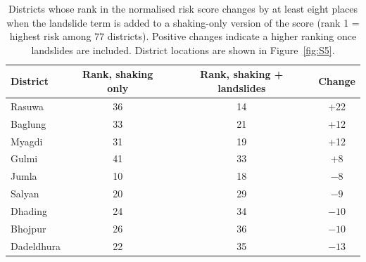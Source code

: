 \documentclass[preprint,12pt,authoryear]{elsarticle}
\begin{document}
\begin{table}[H]
    \centering
    \caption{Districts whose rank in the normalised risk score changes by at least eight places when the landslide term is added to a shaking-only version of the score (rank 1 = highest risk among 77 districts). Positive changes indicate a higher ranking once landslides are included. District locations are shown in Figure~\ref{fig:S5}.}
    \label{tab:S2}
    \begin{tabular}{lccc}
        \toprule
        District & Rank, shaking only & Rank, shaking + landslides & Change \\
        \midrule
        Rasuwa & 36 & 14 & +22 \\
        Baglung & 33 & 21 & +12 \\
        Myagdi & 31 & 19 & +12 \\
        Gulmi & 41 & 33 & +8 \\
        Jumla & 10 & 18 & $-8$ \\
        Salyan & 20 & 29 & $-9$ \\
        Dhading & 24 & 34 & $-10$ \\
        Bhojpur & 26 & 36 & $-10$ \\
        Dadeldhura & 22 & 35 & $-13$ \\
        \bottomrule
    \end{tabular}
\end{table}
\end{document}
